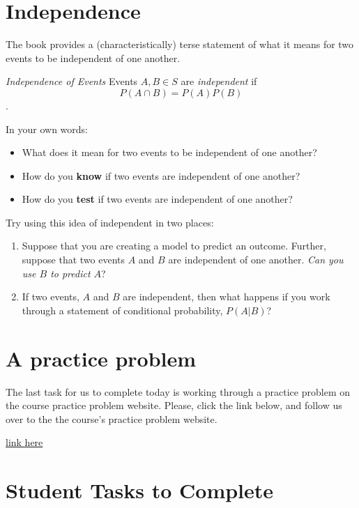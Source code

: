 \documentclass[
  letterpaper,
  DIV=11,
  numbers=noendperiod]{scrreprt}
\providecommand{\tightlist}{%
  \setlength{\itemsep}{0pt}\setlength{\parskip}{0pt}}\usepackage{longtable,booktabs,array}
\begin{document}
\section{Independence}\label{independence}

The book provides a (characteristically) terse statement of what it
means for two events to be independent of one another.

\emph{Independence of Events} Events \(A, B \in S\) are
\emph{independent} if \[P(A \cap B) = P(A)P(B)\].

In your own words:

\begin{itemize}
\tightlist
\item
  What does it mean for two events to be independent of one another?
\item
  How do you \textbf{know} if two events are independent of one another?
\item
  How do you \textbf{test} if two events are independent of one another?
\end{itemize}

Try using this idea of independent in two places:

\begin{enumerate}
\def\labelenumi{\arabic{enumi}.}
\tightlist
\item
  Suppose that you are creating a model to predict an outcome. Further,
  suppose that two events \(A\) and \(B\) are independent of one
  another. \emph{Can you use \(B\) to predict \(A\)}?
\item
  If two events, \(A\) and \(B\) are independent, then what happens if
  you work through a statement of conditional probability, \(P(A|B)\)?
\end{enumerate}

\section{A practice problem}\label{a-practice-problem}

The last task for us to complete today is working through a practice
problem on the course practice problem website. Please, click the link
below, and follow us over to the the course's practice problem website.

\href{https://mids-w203.github.io/practice_problems/}{link here}

\section{Student Tasks to Complete}\label{student-tasks-to-complete}
\end{document}
